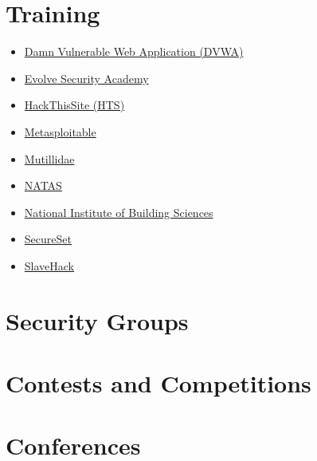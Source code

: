 \documentclass[a4paper, 12pt, titlepage]{report}
\begin{document}
\section{Training}
\begin{multicols}{2}
\begin{itemize}
\item \href{http://www.dvwa.co.uk/}{Damn Vulnerable Web Application (DVWA)}
\item \href{https://www.evolvesecurity.io/academy/home}{Evolve Security Academy}
\item \href{https://www.hackthissite.org/}{HackThisSite (HTS)}
\item \href{https://metasploit.help.rapid7.com/docs/metasploitable-2-exploitability-guide}{Metasploitable}
\item \href{https://www.irongeek.com/i.php?page=mutillidae/mutillidae-deliberately-vulnerable-php-owasp-top-10}{Mutillidae}
\item \href{http://overthewire.org/wargames/natas/}{NATAS}
\item \href{https://www.nibs.org/default.aspx}{National Institute of Building Sciences}
\item \href{https://secureset.com/}{SecureSet}
\item \href{https://www.slavehack2.com/}{SlaveHack}
\end{itemize}
\end{multicols}
\section{Security Groups}
\section{Contests and Competitions}
\section{Conferences}
\printbibliography[heading=bibintoc]
\end{document}
